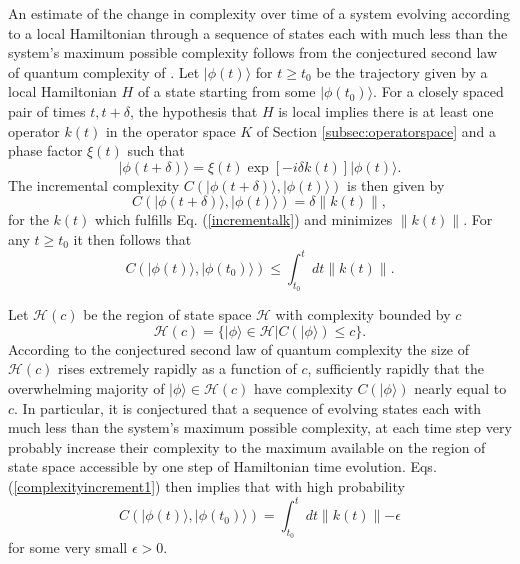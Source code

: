 \documentclass[12pt,amsmath,amssymb,onecolumn]{revtex4-2}
\begin{document}
An estimate of the change in complexity over time of a system
evolving according to a local Hamiltonian  through a sequence of
states each with much less than the system's maximum possible complexity
follows from the conjectured second law of quantum complexity of \cite{Susskind}.
Let $|\phi(t) \rangle $ for $t \ge t_0$ be the trajectory given by a  local Hamiltonian $H$
of a state
starting from some $|\phi(t_0) \rangle $.
For a closely spaced pair of times $t, t + \delta$, the hypothesis that $H$ is local implies
there is at least one operator
$k(t)$ in the operator space $K$ of Section \ref{subsec:operatorspace} and a phase factor
$\xi(t)$ such that
\begin{equation}
  \label{incrementalk}
  |\phi( t + \delta) \rangle  = \xi(t) \exp[ -i \delta k(t)] |\phi(t) \rangle .
\end{equation}
The incremental complexity $C( |\phi(t + \delta) \rangle , |\phi(t) \rangle )$ is then
given by
\begin{equation}
  \label{complexityincrement}
  C( |\phi(t + \delta) \rangle , |\phi(t) \rangle ) = \delta \parallel k(t) \parallel,
\end{equation}
for the $k(t)$ which fulfills Eq. (\ref{incrementalk}) and minimizes $ \parallel k(t) \parallel$.
For any $t \ge t_0$ it then follows that
\begin{equation}
  \label{complexityincrement1}
  C( |\phi(t) \rangle , |\phi(t_0) \rangle ) \le \int_{t_0}^t dt \parallel k(t) \parallel.
\end{equation}

Let $\mathcal{H}(c)$ be the region of state space $\mathcal{H}$ with complexity
bounded by $c$
\begin{equation}
  \label{defhofc}
  \mathcal{H}(c) = \{ |\phi \rangle  \in \mathcal{H} | C( |\phi \rangle ) \le c \}.
\end{equation}
According to the conjectured second law of quantum complexity
the size of $\mathcal{H}(c)$ rises extremely rapidly
as a function of $c$, sufficiently rapidly 
that the overwhelming majority of  $|\phi \rangle  \in \mathcal{H}(c)$ have complexity $C( |\phi \rangle )$
nearly equal to $c$.
In particular, it is conjectured that 
a sequence of evolving states each
with much less than the system's maximum possible complexity,
at each time step very probably increase their complexity to
the maximum available on the region of state space accessible by
one step of Hamiltonian time evolution.
Eqs. (\ref{complexityincrement1}) then implies that
with high probability
\begin{equation}
  \label{complexityincrement2}
  C( |\phi(t) \rangle , |\phi(t_0) \rangle ) = \int_{t_0}^t dt \parallel k(t) \parallel - \epsilon
\end{equation}
for some very small $\epsilon > 0$.
\end{document}
